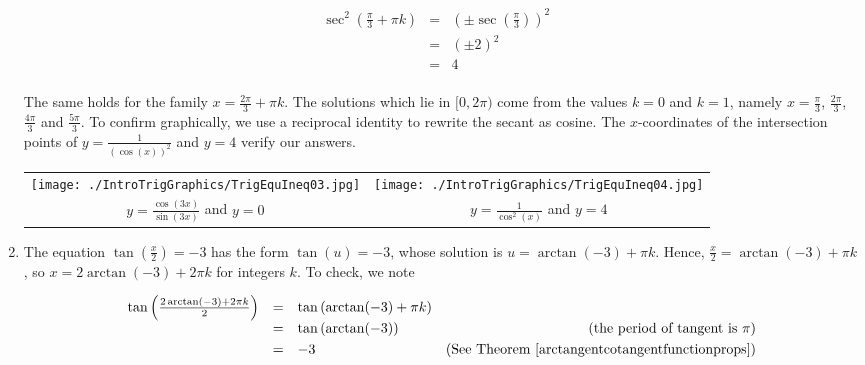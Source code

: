 \begin{ex}
\begin{enumerate}
\[ \begin{array}{rclr}

\sec^{2}\left(\frac{\pi}{3} + \pi k\right)  &  = &  \left( \pm \sec\left(\frac{\pi}{3}\right)\right)^2  & \\ [3pt]
																												& =  &   (\pm 2)^2 &  \\ [3pt]
																												& =  & 4 & \\
																								
\end{array}\] 

The same holds for the family $x =\frac{2\pi}{3} + \pi k$.  The solutions which lie in $[0,2\pi)$ come from the values $k = 0$ and $k=1$, namely $x = \frac{\pi}{3}$, $\frac{2\pi}{3}$, $\frac{4\pi}{3}$ and $\frac{5\pi}{3}$.  To confirm graphically, we use a reciprocal identity to rewrite the secant as cosine.  The $x$-coordinates of the intersection points of  $y = \frac{1}{(\cos(x))^2}$ and $y = 4$ verify our answers.


\begin{center}

\begin{tabular}{cc}

\texttt{[image: ./IntroTrigGraphics/TrigEquIneq03.jpg]} &

\hspace{0.75in} \texttt{[image: ./IntroTrigGraphics/TrigEquIneq04.jpg]} \\

  $y = \frac{\cos(3x)}{\sin(3x)}$ and \boldmath $y=0$   & 

 \hspace{0.75in}   $y = \frac{1}{\cos^{2}(x)}$ and \boldmath $y = 4$  \\

\end{tabular}

\end{center}

\item  The equation  $\tan\left(\frac{x}{2}\right) = -3$ has the form $\tan(u) = -3$, whose solution is $u = \arctan(-3) + \pi k$.  Hence, $\frac{x}{2} = \arctan(-3) + \pi k$, so  $x = 2\arctan(-3) + 2\pi k$ for integers $k$.  To check, we note

\[ \begin{array}{rclr}

\tan\left(\frac{2\arctan(-3) + 2\pi k}{2}\right)  &  = & \tan\left( \arctan(-3) + \pi k \right)  & \\ [3pt]
																												& =  & \tan\left(\arctan(-3) \right) & \text{(the period of tangent is $\pi$)} \\ [3pt]
																												& =  & -3 & (\text{See Theorem } \ref{arctangentcotangentfunctionprops}) \\
																								

\end{array}\]
\end{enumerate}
\end{ex}
